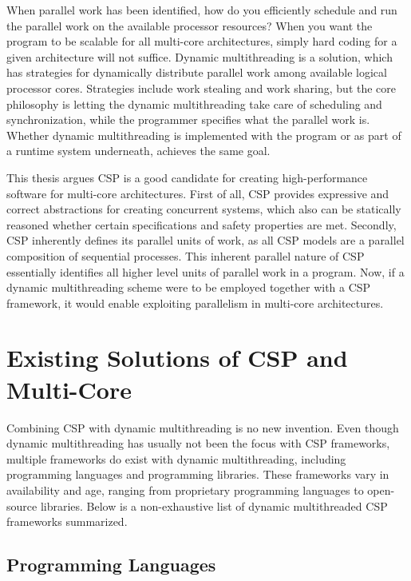When parallel work has been identified, how do you efficiently schedule and run the parallel work on the available processor resources? When you want the program to be scalable for all multi\hyp{}core architectures, simply hard coding for a given architecture will not suffice. Dynamic multithreading is a solution, which has strategies for dynamically distribute parallel work among available logical processor cores. Strategies include work stealing and work sharing, but the core philosophy is letting the dynamic multithreading take care of scheduling and synchronization, while the programmer specifies what the parallel work is. Whether dynamic multithreading is implemented with the program or as part of a runtime system underneath, achieves the same goal. 

This thesis argues CSP is a good candidate for creating high\hyp{}performance software for multi\hyp{}core architectures. First of all, CSP provides expressive and correct abstractions for creating concurrent systems, which also can be statically reasoned whether certain specifications and safety properties are met. Secondly, CSP inherently defines its parallel units of work, as all CSP models are a parallel composition of sequential processes. This inherent parallel nature of CSP essentially identifies all higher level units of parallel work in a program. Now, if a dynamic multithreading scheme were to be employed together with a CSP framework, it would enable exploiting parallelism in multi\hyp{}core architectures.


\section{Existing Solutions of CSP and Multi\hyp{}Core}
\label{sec:multicore_csp_existing}


Combining CSP with dynamic multithreading is no new invention. Even though dynamic multithreading has usually not been the focus with CSP frameworks, multiple frameworks do exist with dynamic multithreading, including programming languages and programming libraries. These frameworks vary in availability and age, ranging from proprietary programming languages to open\hyp{}source libraries. Below is a non\hyp{}exhaustive list of dynamic multithreaded CSP frameworks summarized.


\subsection{Programming Languages}


